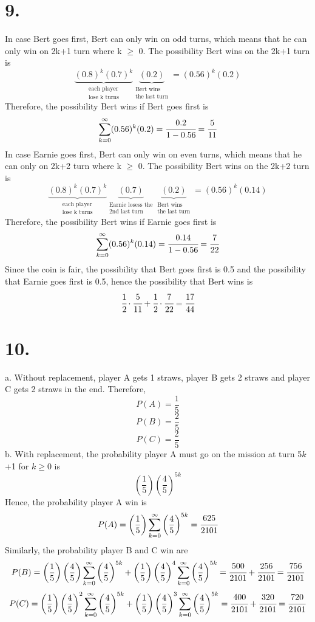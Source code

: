 \documentclass[11pt]{article}
\begin{document}
\section*{9.}
In case Bert goes first, Bert can only win on odd turns, which means that he can only win on 2k+1 turn where k $\ge$ 0.
The possibility Bert wins on the 2k+1 turn is 
\[\underbrace{(0.8)^k (0.7)^k}_{\substack{\text{each player} \\ \text{lose k turns}}}\underbrace{(0.2)}_{\substack{\text{Bert wins} \\ \text{the last turn}}} = (0.56)^k(0.2)\]
Therefore, the possibility Bert wins if Bert goes first is 
\[
\sum_{k=0}^\infty (0.56)^k(0.2) = \cfrac{0.2}{1-0.56} = \cfrac{5}{11}
\]
In case Earnie goes first, Bert can only win on even turns, which means that he can only on 2k+2 turn where k $\ge$ 0. The possibility Bert wins on the 2k+2 turn is
\[
\underbrace{(0.8)^k (0.7)^k}_{\substack{\text{each player} \\ \text{lose k turns}}}
\underbrace{(0.7)}_{\substack{\text{Earnie losess the} \\ \text{2nd last turn}}}
\underbrace{(0.2)}_{\substack{\text{Bert wins} \\ \text{the last turn}}} = (0.56)^k(0.14)
\]
Therefore, the possibility Bert wins if Earnie goes first is 
\[
\sum_{k=0}^\infty (0.56)^k(0.14) = \cfrac{0.14}{1-0.56} = \cfrac{7}{22}
\]
Since the coin is fair, the possibility that Bert goes first is 0.5 and the possibility that Earnie goes first is 0.5, hence the possibility that Bert wins is 
\[
\cfrac{1}{2} \cdot \cfrac{5}{11} + \cfrac{1}{2} \cdot \cfrac{7}{22} = \cfrac{17}{44}
\]
\pagebreak
\section*{10.}
a. Without replacement, player A gets 1 straws, player B gets 2 straws and player C gets 2 straws in the end. Therefore,
\[P(A)=\frac{1}{5}\]
\[P(B)=\frac{2}{5}\]
\[P(C)=\frac{2}{5}\]
b. With replacement, the probability player A must go on the mission at turn 5$k$+1 for $k\ge 0$ is
\[\left(\frac{1}{5}\right) {\left(\frac{4}{5}\right)}^{5k}\]
Hence, the probability player A win is 
\[P(A) = \left( \frac{1}{5} \right) \sum_{k=0}^{\infty} {\left( \frac{4}{5} \right)}^{5k}=\cfrac{625}{2101}\]
Similarly, the probability player B and C win are
\[P(B) = \left( \frac{1}{5} \right) \left( \frac{4}{5} \right) \sum_{k=0}^{\infty} {\left( \frac{4}{5} \right)}^{5k} + \left( \frac{1}{5} \right) {\left( \frac{4}{5} \right)}^4 \sum_{k=0}^{\infty} {\left( \frac{4}{5} \right)}^{5k} = \cfrac{500}{2101} + \cfrac{256}{2101} = \cfrac{756}{2101}\]
\[P(C) = \left( \frac{1}{5} \right) {\left( \frac{4}{5} \right)}^2 \sum_{k=0}^{\infty} {\left( \frac{4}{5} \right)}^{5k} + \left( \frac{1}{5} \right) {\left( \frac{4}{5} \right)}^3 \sum_{k=0}^{\infty} {\left( \frac{4}{5} \right)}^{5k} = \cfrac{400}{2101} + \cfrac{320}{2101} = \cfrac{720}{2101}\]
\end{document}
